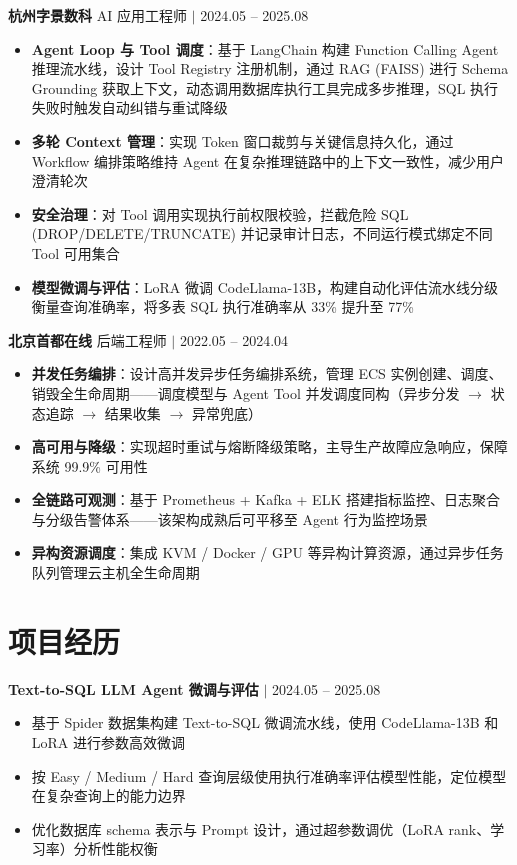 \documentclass[10pt, a4paper]{article}
\newcommand{\entry}[3]{
  \vspace{0.3em}
  \noindent\textbf{#1} \hfill {\color{gray}\small #2 $\mid$ #3}\newline
}
\begin{document}
\entry{杭州字景数科}{AI 应用工程师}{2024.05 -- 2025.08}
\begin{itemize}
  \item \textbf{Agent Loop 与 Tool 调度}：基于 LangChain 构建 Function Calling Agent 推理流水线，设计 Tool Registry 注册机制，通过 RAG (FAISS) 进行 Schema Grounding 获取上下文，动态调用数据库执行工具完成多步推理，SQL 执行失败时触发自动纠错与重试降级
  \item \textbf{多轮 Context 管理}：实现 Token 窗口裁剪与关键信息持久化，通过 Workflow 编排策略维持 Agent 在复杂推理链路中的上下文一致性，减少用户澄清轮次
  \item \textbf{安全治理}：对 Tool 调用实现执行前权限校验，拦截危险 SQL (DROP/DELETE/TRUNCATE) 并记录审计日志，不同运行模式绑定不同 Tool 可用集合
  \item \textbf{模型微调与评估}：LoRA 微调 CodeLlama-13B，构建自动化评估流水线分级衡量查询准确率，将多表 SQL 执行准确率从 33\% 提升至 77\%
\end{itemize}

\entry{北京首都在线}{后端工程师}{2022.05 -- 2024.04}
\begin{itemize}
  \item \textbf{并发任务编排}：设计高并发异步任务编排系统，管理 ECS 实例创建、调度、销毁全生命周期——调度模型与 Agent Tool 并发调度同构（异步分发 $\to$ 状态追踪 $\to$ 结果收集 $\to$ 异常兜底）
  \item \textbf{高可用与降级}：实现超时重试与熔断降级策略，主导生产故障应急响应，保障系统 99.9\% 可用性
  \item \textbf{全链路可观测}：基于 Prometheus + Kafka + ELK 搭建指标监控、日志聚合与分级告警体系——该架构成熟后可平移至 Agent 行为监控场景
  \item \textbf{异构资源调度}：集成 KVM / Docker / GPU 等异构计算资源，通过异步任务队列管理云主机全生命周期
\end{itemize}

\section{项目经历}

\entry{Text-to-SQL LLM Agent 微调与评估}{}{2024.05 -- 2025.08}
\begin{itemize}
  \item 基于 Spider 数据集构建 Text-to-SQL 微调流水线，使用 CodeLlama-13B 和 LoRA 进行参数高效微调
  \item 按 Easy / Medium / Hard 查询层级使用执行准确率评估模型性能，定位模型在复杂查询上的能力边界
  \item 优化数据库 schema 表示与 Prompt 设计，通过超参数调优（LoRA rank、学习率）分析性能权衡
\end{itemize}
\end{document}
